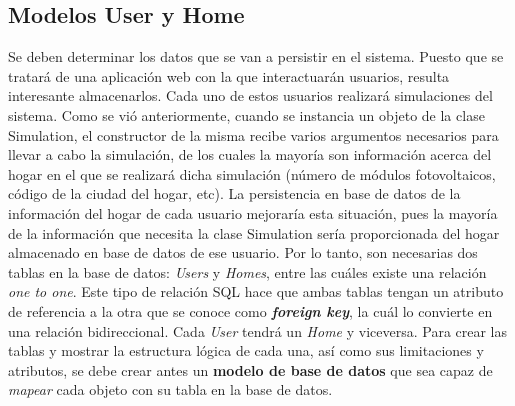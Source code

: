 \subsection{Modelos User y Home}
Se deben determinar los datos que se van a persistir en el sistema. Puesto que se tratará de una aplicación web con la que interactuarán usuarios, resulta interesante almacenarlos. Cada uno de estos usuarios realizará simulaciones del sistema. Como se vió anteriormente, cuando se instancia un objeto de la clase Simulation, el constructor de la misma recibe varios argumentos necesarios para llevar a cabo la simulación, de los cuales la mayoría son información acerca del hogar en el que se realizará dicha simulación (número de módulos fotovoltaicos, código de la ciudad del hogar, etc). La persistencia en base de datos de la información del hogar de cada usuario mejoraría esta situación, pues la mayoría de la información que necesita la clase Simulation sería proporcionada del hogar almacenado en base de datos de ese usuario. Por lo tanto, son necesarias dos tablas en la base de datos: \textit{Users} y \textit{Homes}, entre las cuáles existe una relación \textit{one to one}. Este tipo de relación SQL hace que ambas tablas tengan un atributo de referencia a la otra que se conoce como \textit{\textbf{foreign key}}, la cuál lo convierte en una relación bidireccional. Cada \textit{User} tendrá un \textit{Home} y viceversa. Para crear las tablas y mostrar la estructura lógica de cada una, así como sus limitaciones y atributos, se debe crear antes un \textbf{modelo de base de datos} que sea capaz de \textit{mapear} cada objeto con su tabla en la base de datos.\\

